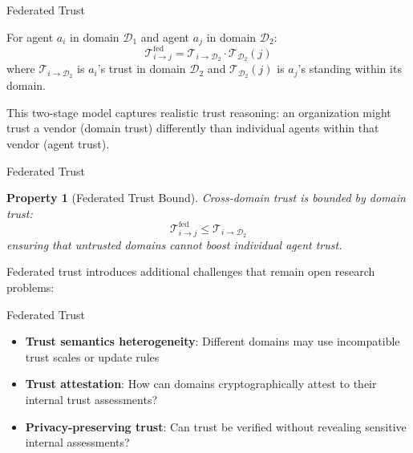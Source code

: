 \documentclass[
  ignorenonframetext,
]{beamer}
\newtheorem{property}{Property}
\begin{document}
\begin{frame}[allowframebreaks]{Federated Trust}
\begin{definition}
\label{def:cross-domain-trust}
For agent $a_i$ in domain $\mathcal{D}_1$ and agent $a_j$ in domain $\mathcal{D}_2$:
\begin{equation}
\label{eq:cross-domain-trust}
\mathcal{T}_{i \to j}^{\text{fed}} = \mathcal{T}_{i \to \mathcal{D}_2} \cdot \mathcal{T}_{\mathcal{D}_2}(j)
\end{equation}
where $\mathcal{T}_{i \to \mathcal{D}_2}$ is $a_i$'s trust in domain $\mathcal{D}_2$ and $\mathcal{T}_{\mathcal{D}_2}(j)$ is $a_j$'s standing within its domain.
\end{definition}

This two-stage model captures realistic trust reasoning: an organization
might trust a vendor (domain trust) differently than individual agents
within that vendor (agent trust).

\end{frame}

\begin{frame}[allowframebreaks]{Federated Trust}
\begin{property}[Federated Trust Bound]
\label{prop:federated-bound}
Cross-domain trust is bounded by domain trust:
\begin{equation}
\label{eq:federated-bound}
\mathcal{T}_{i \to j}^{\text{fed}} \leq \mathcal{T}_{i \to \mathcal{D}_2}
\end{equation}
ensuring that untrusted domains cannot boost individual agent trust.
\end{property}

Federated trust introduces additional challenges that remain open
research problems:

\end{frame}

\begin{frame}[allowframebreaks]{Federated Trust}
\begin{itemize}
\item \textbf{Trust semantics heterogeneity}: Different domains may use incompatible trust scales or update rules
\item \textbf{Trust attestation}: How can domains cryptographically attest to their internal trust assessments?
\item \textbf{Privacy-preserving trust}: Can trust be verified without revealing sensitive internal assessments?
\end{itemize}
\end{frame}
\end{document}
